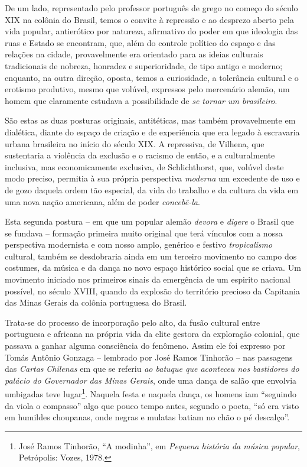 De um lado, representado pelo professor português de grego no começo do
século XIX na colônia do Brasil, temos o convite à repressão e ao
desprezo aberto pela vida popular, antierótico por natureza, afirmativo
do poder em que ideologia das ruas e Estado se encontram, que, além do
controle político do espaço e das relações na cidade, provavelmente era
orientado para as ideias culturais tradicionais de nobreza, honradez e
superioridade, de tipo antigo e moderno; enquanto, na outra direção,
oposta, temos a curiosidade, a tolerância cultural e o erotismo
produtivo, mesmo que volúvel, expressos pelo mercenário alemão, um homem
que claramente estudava a possibilidade de \emph{se tornar um
brasileiro}.

São estas as duas posturas originais, antitéticas, mas também
provavelmente em dialética, diante do espaço de criação e de experiência
que era legado à escravaria urbana brasileira no início do século XIX. A
repressiva, de Vilhena, que sustentaria a violência da exclusão e o
racismo de então, e a culturalmente inclusiva, mas economicamente
exclusiva, de Schlichthorst, que, volúvel deste modo preciso, permitia à
sua própria perspectiva \emph{moderna} um excedente de uso e de gozo
daquela ordem tão especial, da vida do trabalho e da cultura da vida em
uma nova nação americana, além de poder \emph{concebê-la}.

Esta segunda postura -- em que um popular alemão \emph{devora} e
\emph{digere} o Brasil que se fundava -- formação primeira muito
original que terá vínculos com a nossa perspectiva modernista e com
nosso amplo, genérico e festivo \emph{tropicalismo} cultural, também se
desdobraria ainda em um terceiro movimento no campo dos costumes, da
música e da dança no novo espaço histórico social que se criava. Um
movimento iniciado nos primeiros sinais da emergência de um espirito
nacional possível, no século XVIII, quando da explosão do território
precioso da Capitania das Minas Gerais da colônia portuguesa do Brasil.

Trata-se do processo de incorporação pelo alto, da fusão cultural entre
portuguesa e africana na própria vida da elite gestora da exploração
colonial, que passava a ganhar alguma consciência do fenômeno. Assim ele
foi expresso por Tomás Antônio Gonzaga -- lembrado por José Ramos
Tinhorão -- nas passagens das \emph{Cartas} \emph{Chilenas} em que se
referiu \emph{ao batuque que aconteceu nos bastidores do palácio do
Governador das Minas Gerais}, onde uma dança de salão que envolvia
umbigadas teve lugar\footnote{José Ramos Tinhorão, ``A modinha'', em
  \emph{Pequena história da música popular}, Petrópolis: Vozes, 1978.}.
Naquela festa e naquela dança, os homens iam ``seguindo da viola o
compasso'' algo que pouco tempo antes, segundo o poeta, ``só era visto
em humildes choupanas, onde negras e mulatas batiam no chão o pé
descalço''.

